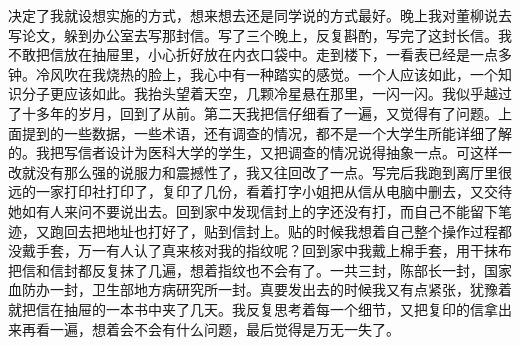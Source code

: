 \documentclass[12pt,oneside]{book}
\begin{document}
决定了我就设想实施的方式，想来想去还是同学说的方式最好。晚上我对董柳说去写论文，躲到办公室去写那封信。写了三个晚上，反复斟酌，写完了这封长信。我不敢把信放在抽屉里，小心折好放在内衣口袋中。走到楼下，一看表已经是一点多钟。冷风吹在我烧热的脸上，我心中有一种踏实的感觉。一个人应该如此，一个知识分子更应该如此。我抬头望着天空，几颗冷星悬在那里，一闪一闪。我似乎越过了十多年的岁月，回到了从前。第二天我把信仔细看了一遍，又觉得有了问题。上面提到的一些数据，一些术语，还有调查的情况，都不是一个大学生所能详细了解的。我把写信者设计为医科大学的学生，又把调查的情况说得抽象一点。可这样一改就没有那么强的说服力和震撼性了，我又往回改了一点。写完后我跑到离厅里很远的一家打印社打印了，复印了几份，看着打字小姐把从信从电脑中删去，又交待她如有人来问不要说出去。回到家中发现信封上的字还没有打，而自己不能留下笔迹，又跑回去把地址也打好了，贴到信封上。贴的时候我想着自己整个操作过程都没戴手套，万一有人认了真来核对我的指纹呢？回到家中我戴上棉手套，用干抹布把信和信封都反复抹了几遍，想着指纹也不会有了。一共三封，陈部长一封，国家血防办一封，卫生部地方病研究所一封。真要发出去的时候我又有点紧张，犹豫着就把信在抽屉的一本书中夹了几天。我反复思考着每一个细节，又把复印的信拿出来再看一遍，想着会不会有什么问题，最后觉得是万无一失了。
\end{document}
